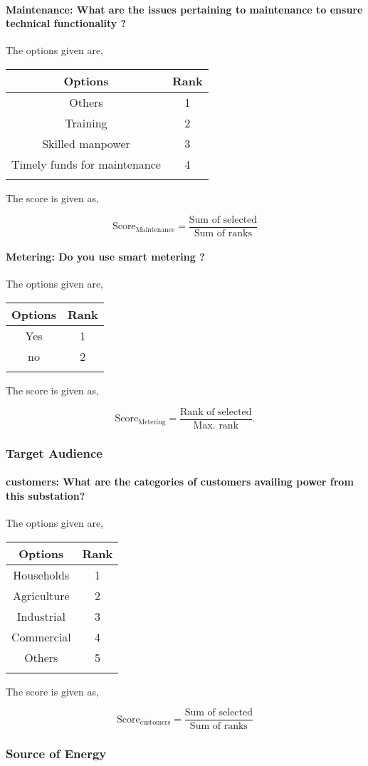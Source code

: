 \documentclass[oneside,twocolumn]{article}
\newcommand{\tsub}[2]{\text{#1}_{\text{#2}}}
\newcommand{\dsub}[2]{\dfrac{\text{#1}}{\text{#2}}}
\newcommand{\multsel}[1]
{
	\[
		\tsub{Score}{#1} = \dsub{Sum of selected}{Sum of ranks}
	\]
}
\newcommand{\singsel}[1]
{
	\[
		\tsub{Score}{#1} = \dsub{Rank of selected}{Max. rank}.
	\]
}
\newenvironment{ttable}
{
\begin{center}
\begin{tabular}{c|c}
\hline
}
{
\\ \hline
\end{tabular}
\end{center}
}
\begin{document}
\paragraph{Maintenance: What are the issues pertaining to maintenance to ensure technical functionality ?}

The options given are,
\begin{ttable}
Options & Rank \\ \hline
Others & 1 \\
Training & 2 \\
Skilled manpower & 3 \\
Timely funds for maintenance & 4 \\
\hline
\end{ttable}
The score is given as,
\multsel{Maintenance}
\paragraph{Metering: Do you use smart metering ?}

The options given are,
\begin{ttable}
Options & Rank \\ \hline
Yes & 1 \\
no & 2 \\
\hline
\end{ttable}
The score is given as,
\singsel{Metering}
\subsubsection{Target Audience}

\paragraph{customers: What are the categories of customers availing power from this substation?}

The options given are,
\begin{ttable}
Options & Rank \\ \hline
Households & 1 \\
Agriculture & 2 \\
Industrial & 3 \\
Commercial & 4 \\
Others & 5 \\
\hline
\end{ttable}
The score is given as,
\multsel{customers}
\subsubsection{Source of Energy}
\end{document}
